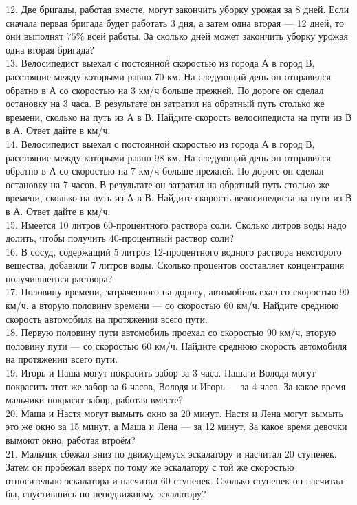 12. Две бригады, работая вместе, могут закончить уборку урожая за 8 дней. Если сначала первая бригада будет работать 3 дня, а затем одна вторая --- 12 дней, то они выполнят $75\%$ всей работы. За сколько дней может закончить уборку урожая одна вторая бригада?\\
13. Велосипедист выехал с постоянной скоростью из города А в город В, расстояние между которыми равно 70 км. На следующий день он отправился обратно в А со скоростью на 3 км/ч больше прежней. По дороге он сделал остановку на 3 часа. В результате он затратил на обратный путь столько же времени, сколько на путь из А в В. Найдите скорость велосипедиста на пути из В в А. Ответ дайте в км/ч.\\
14. Велосипедист выехал с постоянной скоростью из города А в город В, расстояние между которыми равно 98 км. На следующий день он отправился обратно в А со скоростью на 7 км/ч больше прежней. По дороге он сделал остановку на 7 часов. В результате он затратил на обратный путь столько же времени, сколько на путь из А в В. Найдите скорость велосипедиста на пути из В в А. Ответ дайте в км/ч.\\
15. Имеется 10 литров 60-процентного раствора соли. Сколько литров воды надо долить, чтобы получить 40-процентный раствор соли?\\
16. В сосуд, содержащий 5 литров 12-процентного водного раствора некоторого вещества, добавили 7 литров воды. Сколько процентов составляет концентрация получившегося раствора?\\
17. Половину времени, затраченного на дорогу, автомобиль ехал со скоростью 90 км/ч, а вторую половину времени --- со скоростью 60 км/ч. Найдите среднюю скорость автомобиля на протяжении всего пути.\\
18. Первую половину пути автомобиль проехал со скоростью 90 км/ч, вторую половину пути --- со скоростью 60 км/ч. Найдите среднюю скорость автомобиля на протяжении всего пути.\\
19. Игорь и Паша могут покрасить забор за 3 часа. Паша и Володя могут покрасить этот же забор за 6 часов, Володя и Игорь --- за 4 часа. За какое время мальчики покрасят забор, работая вместе?\\
20. Маша и Настя могут вымыть окно за 20 минут. Настя и Лена могут вымыть это же окно за 15 минут, а Маша и Лена --- за 12 минут. За какое время девочки вымоют окно, работая втроём?\\
21. Мальчик сбежал вниз по движущемуся эскалатору и насчитал 20 ступенек. Затем он пробежал вверх по тому же эскалатору с той же скоростью относительно эскалатора и насчитал 60 ступенек. Сколько ступенек он насчитал бы, спустившись по неподвижному эскалатору?\\
